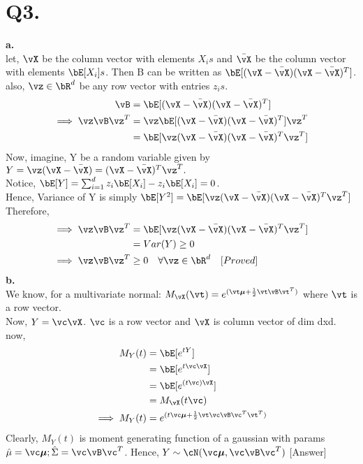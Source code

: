 \documentclass[a4paper,11pt]{article}
\begin{document}
\section*{Q3.}
\textbf{a.}\\
let, $\vX$ be the column vector with elements $X_is$ and $\bar{\vX}$ be the column vector with elements $\bE[X_i]s$. Then B can be written as $\bE[(\vX - \bar{\vX})(\vX - \bar{\vX})^T]$. also, $\vz \in \bR^d$ be any row vector with entries $z_is$.
\begin{align*}
 \vB &= \bE[(\vX - \bar{\vX})(\vX - \bar{\vX})^T]\\
 \implies \vz\vB\vz^T &= \vz\bE[(\vX - \bar{\vX})(\vX - \bar{\vX})^T]\vz^T\\
 &= \bE[\vz(\vX - \bar{\vX})(\vX - \bar{\vX})^T\vz^T]\\
\end{align*}
Now, imagine, Y be a random variable given by $Y = \vz(\vX -\bar{\vX})  = (\vX -\bar{\vX})^T\vz^T.$\\
Notice, $\bE[Y] = \sum_{i=1}^{d}z_i\bE[X_i] - z_i\bE[X_i] = 0$.\\
Hence, Variance of Y is simply $\bE[Y^2] = \bE[\vz(\vX -\bar{\vX})(\vX -\bar{\vX})^T\vz^T]$
Therefore,
\begin{align*}
 \implies \vz\vB\vz^T &= \bE[\vz(\vX - \bar{\vX})(\vX - \bar{\vX})^T\vz^T]\\
 &= Var(Y) \geq 0 \\
 \implies \vz\vB\vz^T &\geq 0 \hspace{10pt} \forall \vz \in \bR^d \hspace{10pt} [Proved]
\end{align*}
\textbf{b.}\\
We know, for a multivariate normal: $M_{\vX}(\vt) = e^{(\vt\boldsymbol{\mu} + \frac{1}{2}\vt\vB\vt^T)}$ where $\vt$ is a row vector.\\
Now, 
$Y = \vc\vX$. $\vc$ is a  row vector and $\vX$ is column vector of dim dxd.\\
now,
\begin{align*}
 M_Y(t) &= \bE[e^{tY}]\\
 &=\bE[e^{t\vc\vX}]\\
 &=\bE[e^{(t\vc)\vX}]\\
 &=M_{\vX}(t\vc)\\
 \implies M_Y(t) &= e^{(t\vc\boldsymbol{\mu} + \frac{1}{2}\vt\vc\vB\vc^T\vt^T)}\\
\end{align*}
Clearly, $M_Y(t)$ is moment generating function of a gaussian with params $\hat{\mu} = \vc\boldsymbol{\mu}; \hat{\Sigma} = \vc\vB\vc^T$. 
Hence, $Y \sim \cN(\vc\boldsymbol{\mu},  \vc\vB\vc^T)$ [Answer]
\end{document}
